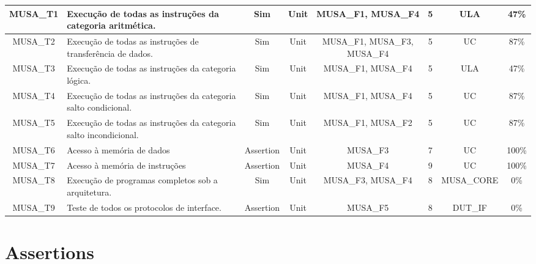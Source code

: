 \documentclass{article}
\begin{document}
\begin{landscape}
\begin{center}
\begin{longtable}[pos]{| c | m{5cm} | c | c | c | c | c | c |}
        \hline
        \endlastfoot
      	MUSA\_T1      & Execução de todas as instruções da categoria aritmética.          &	Sim       & Unit & MUSA\_F1, MUSA\_F4 & 5 & ULA & 47\% \\ \hline   
      	MUSA\_T2      & Execução de todas as instruções de transferência de dados.        &	Sim       & Unit & MUSA\_F1, MUSA\_F3, MUSA\_F4 & 5 & UC & 87\% \\ \hline   
      	MUSA\_T3      & Execução de todas as instruções da categoria lógica.              &	Sim       & Unit & MUSA\_F1, MUSA\_F4 & 5 & ULA & 47\% \\ \hline  
      	MUSA\_T4      & Execução de todas as instruções da categoria salto condicional.   &	Sim       & Unit & MUSA\_F1, MUSA\_F4 & 5 & UC & 87\% \\ \hline 
      	MUSA\_T5      & Execução de todas as instruções da categoria salto incondicional. &	Sim       & Unit & MUSA\_F1, MUSA\_F2 & 5 & UC & 87\% \\ \hline 
	      MUSA\_T6      & Acesso à memória de dados                                       &	Assertion & Unit & MUSA\_F3           & 7 & UC & 100\% \\ \hline        
	      MUSA\_T7      & Acesso à memória de instruções                                  &	Assertion & Unit & MUSA\_F4           & 9 & UC & 100\% \\ \hline        
	      MUSA\_T8      & Execução de programas completos sob a arquitetura.              &	Sim       & Unit & MUSA\_F3, MUSA\_F4 & 8 & MUSA\_CORE & 0\% \\ \hline        
	      MUSA\_T9      & Teste de todos os protocolos de interface.                      & Assertion & Unit & MUSA\_F5           & 8 & DUT\_IF & 0\% \\ \hline        

      \end{longtable}
    \end{center}		
  \end{landscape}
  
  \newpage
	\section{Assertions}
\end{document}
